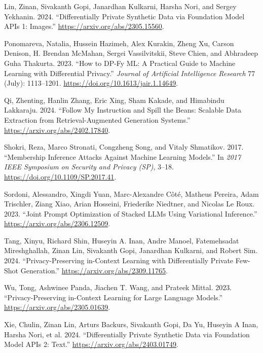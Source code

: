 \documentclass[conference]{IEEEtran}
\begin{document}
\begin{thebibliography}{00}
Lin, Zinan, Sivakanth Gopi, Janardhan Kulkarni, Harsha Nori, and Sergey
Yekhanin. 2024. {``Differentially Private Synthetic Data via Foundation
Model APIs 1: Images.''} \url{https://arxiv.org/abs/2305.15560}.

Ponomareva, Natalia, Hussein Hazimeh, Alex Kurakin, Zheng Xu, Carson
Denison, H. Brendan McMahan, Sergei Vassilvitskii, Steve Chien, and
Abhradeep Guha Thakurta. 2023. {``How to DP-Fy ML: A Practical Guide to
Machine Learning with Differential Privacy.''} \emph{Journal of
Artificial Intelligence Research} 77 (July): 1113--1201.
\url{https://doi.org/10.1613/jair.1.14649}.

Qi, Zhenting, Hanlin Zhang, Eric Xing, Sham Kakade, and Himabindu
Lakkaraju. 2024. {``Follow My Instruction and Spill the Beans: Scalable
Data Extraction from Retrieval-Augmented Generation Systems.''}
\url{https://arxiv.org/abs/2402.17840}.

Shokri, Reza, Marco Stronati, Congzheng Song, and Vitaly Shmatikov.
2017. {``Membership Inference Attacks Against Machine Learning
Models.''} In \emph{2017 IEEE Symposium on Security and Privacy (SP)},
3--18. \url{https://doi.org/10.1109/SP.2017.41}.

Sordoni, Alessandro, Xingdi Yuan, Marc-Alexandre Côté, Matheus Pereira,
Adam Trischler, Ziang Xiao, Arian Hosseini, Friederike Niedtner, and
Nicolas Le Roux. 2023. {``Joint Prompt Optimization of Stacked LLMs
Using Variational Inference.''} \url{https://arxiv.org/abs/2306.12509}.

Tang, Xinyu, Richard Shin, Huseyin A. Inan, Andre Manoel, Fatemehsadat
Mireshghallah, Zinan Lin, Sivakanth Gopi, Janardhan Kulkarni, and Robert
Sim. 2024. {``Privacy-Preserving in-Context Learning with Differentially
Private Few-Shot Generation.''} \url{https://arxiv.org/abs/2309.11765}.

Wu, Tong, Ashwinee Panda, Jiachen T. Wang, and Prateek Mittal. 2023.
{``Privacy-Preserving in-Context Learning for Large Language Models.''}
\url{https://arxiv.org/abs/2305.01639}.

Xie, Chulin, Zinan Lin, Arturs Backurs, Sivakanth Gopi, Da Yu, Huseyin A
Inan, Harsha Nori, et al. 2024. {``Differentially Private Synthetic Data
via Foundation Model APIs 2: Text.''}
\url{https://arxiv.org/abs/2403.01749}.


\end{thebibliography}
\end{document}
